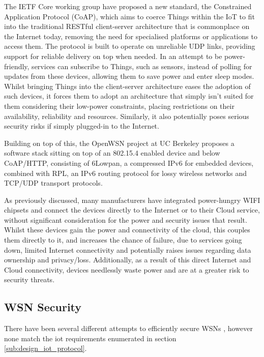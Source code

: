 \documentclass[conference]{./sty/IEEEtran}
\begin{document}
The IETF Core working group have proposed a new standard, the Constrained Application Protocol (CoAP)\cite{IETF_COAP_HTTP}, which aims to coerce Things within the IoT to fit into the traditional RESTful client-server architecture that is commonplace on the Internet today, removing the need for specialised platforms or applications to access them. The protocol is built to operate on unreliable UDP links, providing support for reliable delivery on top when needed. In an attempt to be power-friendly, services can subscribe to Things, such as sensors, instead of polling for updates from these devices, allowing them to save power and enter sleep modes. Whilst bringing Things into the client-server architecture eases the adoption of such devices, it forces them to adopt an architecture that simply isn't suited for them considering their low-power constraints, placing restrictions on their availability, reliability and resources. Similarly, it also potentially poses serious security risks if simply plugged-in to the Internet\cite{BelkinWemo}.

Building on top of this, the OpenWSN project at UC Berkeley proposes a software stack sitting on top of an 802.15.4 enabled device and below CoAP/HTTP, consisting of 6Lowpan, a compressed IPv6 for embedded devices, combined with RPL, an IPv6 routing protocol for lossy wireless networks and TCP/UDP transport protocols.

As previously discussed, many manufacturers have integrated power-hungry WIFI chipsets and connect the devices directly to the Internet or to their Cloud service\cite{SmartThings,Belkin,Twine}, without significant consideration for the power and security issues that result. Whilst these devices gain the power and connectivity of the cloud, this couples them directly to it, and increases the chance of failure, due to services going down, limited Internet connectivity and potentially raises issues regarding data ownership and privacy/loss\cite{Playstation}. Additionally, as a result of this direct Internet and Cloud connectivity, devices needlessly waste power and are at a greater risk to security threats\cite{BelkinWemo,IoTWorm}. 
\subsection{WSN Security} %
\label{sub:wsn_security}
There have been several different attempts to efficiently secure WSNs \cite{TinySec,MiniSec,TinyECC,TinyPK,TinyPBC,Shi2013235,ContikiSec,MessageBottle,CertificatePairwise,MizanurRahman2010858}, however none match the iot requirements enumerated in section \ref{sub:design_iot_protocol}.
\end{document}
